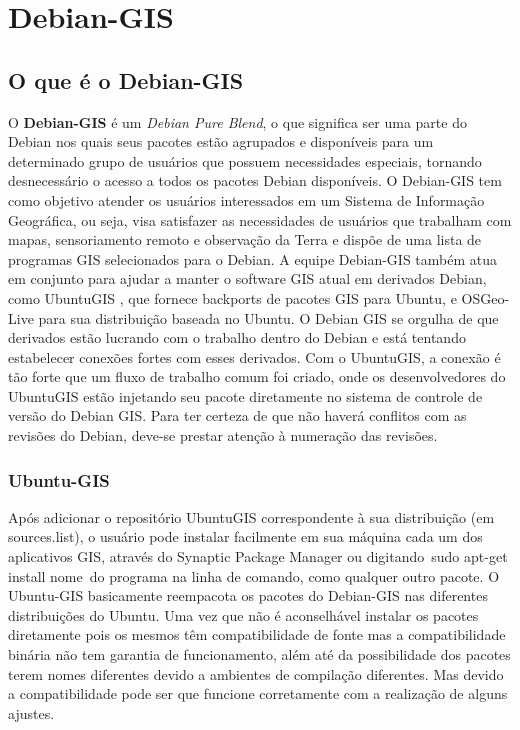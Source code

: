 \chapter{Debian-GIS}
\section{O que é o Debian-GIS}

O \textbf{Debian-GIS} é um \textit{Debian Pure Blend}, o que significa ser uma parte do Debian nos quais seus pacotes estão agrupados e disponíveis para um determinado grupo de usuários que possuem necessidades especiais, tornando desnecessário o acesso a todos os pacotes Debian disponíveis. O Debian-GIS tem como objetivo atender os usuários interessados em um Sistema de Informação Geográfica, ou seja, visa satisfazer as necessidades de usuários que trabalham com mapas, sensoriamento remoto e observação da Terra e dispõe de uma lista de programas GIS selecionados para o Debian.
A equipe Debian-GIS também atua em conjunto para ajudar a manter o software GIS atual em derivados Debian, como UbuntuGIS , que fornece backports de pacotes GIS para Ubuntu, e OSGeo-Live para sua distribuição baseada no Ubuntu.
O Debian GIS se orgulha de que derivados estão lucrando com o trabalho dentro do Debian e está tentando estabelecer conexões fortes com esses derivados. Com o UbuntuGIS, a conexão é tão forte que um fluxo de trabalho comum foi criado, onde os desenvolvedores do UbuntuGIS estão injetando seu pacote diretamente no sistema de controle de versão do Debian GIS. Para ter certeza de que não haverá conflitos com as revisões do Debian, deve-se prestar atenção à numeração das revisões.

\subsection{Ubuntu-GIS}

Após adicionar o repositório UbuntuGIS correspondente à sua distribuição (em sources.list), o usuário pode instalar facilmente em sua máquina cada um dos aplicativos GIS, através do Synaptic Package Manager ou digitando sudo apt-get install nome do programa na linha de comando, como qualquer outro pacote. 
O Ubuntu-GIS basicamente reempacota os pacotes do Debian-GIS nas diferentes distribuições do Ubuntu. Uma vez que não é aconselhável instalar os pacotes diretamente pois os mesmos têm compatibilidade de fonte mas a compatibilidade binária não tem garantia de funcionamento, além até da possibilidade dos pacotes terem nomes diferentes devido a ambientes de compilação diferentes. Mas devido a compatibilidade pode ser que funcione corretamente com a realização de alguns ajustes.

